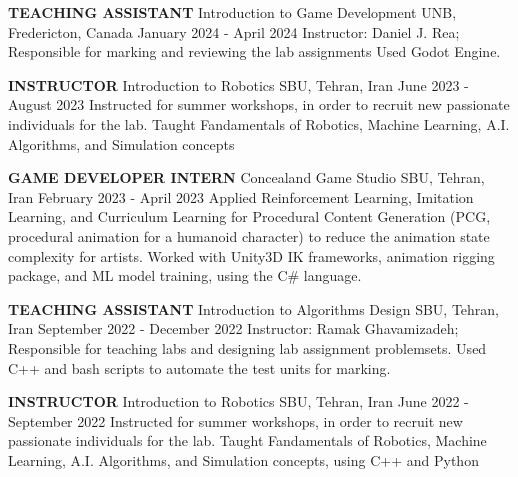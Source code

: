 \begin{cventries}
    \cventry
    {\textbf{TEACHING ASSISTANT}}
    {Introduction to Game Development}
    {UNB, Fredericton, Canada}
    {January 2024 - April 2024}
    {
        Instructor: Daniel J. Rea; Responsible for marking and reviewing the lab assignments 
        \newline Used Godot Engine.
    }
    \vspace{0.4 cm}
\end{cventries}

\begin{cventries}
    \cventry
    {\textbf{INSTRUCTOR}}
    {Introduction to Robotics}
    {SBU, Tehran, Iran}
    {June 2023 - August 2023}
    {Instructed for summer workshops, in order to recruit new passionate individuals for the lab.
    \newline Taught Fandamentals of Robotics, Machine Learning, A.I. Algorithms, and Simulation concepts}
    \vspace{0.4 cm}
\end{cventries}

\begin{cventries}
    \cventry
    {\textbf{GAME DEVELOPER INTERN}}
    {Concealand Game Studio}
    {SBU, Tehran, Iran}
    {February 2023 - April 2023}
    {Applied Reinforcement Learning, Imitation Learning, and Curriculum Learning for Procedural Content Generation (PCG, procedural animation for a humanoid character) to reduce the animation state complexity for artists. 
    \newline Worked with Unity3D IK frameworks, animation rigging package, and ML model training, using the C\# language.}
\end{cventries}
\begin{cventries}
    \cventry
    {\textbf{TEACHING ASSISTANT}}
    {Introduction to Algorithms Design}
    {SBU, Tehran, Iran}
    {September 2022 - December 2022}
    {Instructor: Ramak Ghavamizadeh; Responsible for teaching labs and designing lab assignment problemsets.
    \newline Used C++ and bash scripts to automate the test units for marking.}
    \vspace{0.4 cm}
\end{cventries}

\begin{cventries}
    \cventry
    {\textbf{INSTRUCTOR}}
    {Introduction to Robotics}
    {SBU, Tehran, Iran}
    {June 2022 - September 2022}
    {Instructed for summer workshops, in order to recruit new passionate individuals for the lab.
    \newline Taught Fandamentals of Robotics, Machine Learning, A.I. Algorithms, and Simulation concepts, using C++ and Python}
    \vspace{0.4 cm}
\end{cventries}

